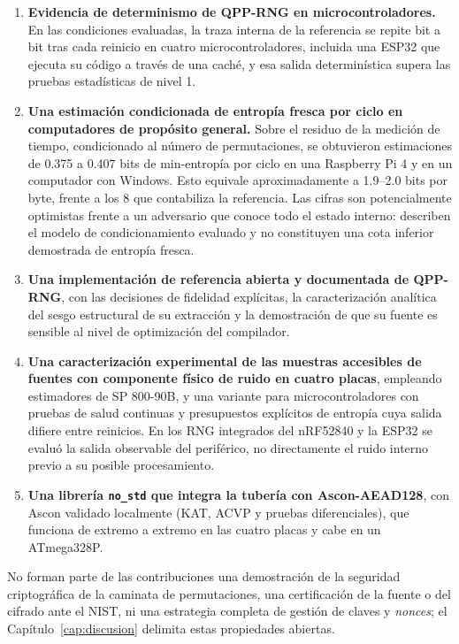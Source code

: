 \begin{enumerate}
    \item \textbf{Evidencia de determinismo de QPP-RNG en microcontroladores.} En las condiciones evaluadas, la traza interna de la referencia se repite bit a bit tras cada reinicio en cuatro microcontroladores, incluida una ESP32 que ejecuta su código a través de una caché, y esa salida determinística supera las pruebas estadísticas de nivel 1.
    \item \textbf{Una estimación condicionada de entropía fresca por ciclo en computadores de propósito general.} Sobre el residuo de la medición de tiempo, condicionado al número de permutaciones, se obtuvieron estimaciones de 0.375 a 0.407 bits de min-entropía por ciclo en una Raspberry Pi 4 y en un computador con Windows. Esto equivale aproximadamente a 1.9--2.0 bits por byte, frente a los 8 que contabiliza la referencia. Las cifras son potencialmente optimistas frente a un adversario que conoce todo el estado interno: describen el modelo de condicionamiento evaluado y no constituyen una cota inferior demostrada de entropía fresca.
    \item \textbf{Una implementación de referencia abierta y documentada de QPP-RNG}, con las decisiones de fidelidad explícitas, la caracterización analítica del sesgo estructural de su extracción y la demostración de que su fuente es sensible al nivel de optimización del compilador.
    \item \textbf{Una caracterización experimental de las muestras accesibles de fuentes con componente físico de ruido en cuatro placas}, empleando estimadores de SP 800-90B, y una variante para microcontroladores con pruebas de salud continuas y presupuestos explícitos de entropía cuya salida difiere entre reinicios. En los RNG integrados del nRF52840 y la ESP32 se evaluó la salida observable del periférico, no directamente el ruido interno previo a su posible procesamiento.
    \item \textbf{Una librería \texttt{no\_std} que integra la tubería con Ascon-AEAD128}, con Ascon validado localmente (KAT, ACVP y pruebas diferenciales), que funciona de extremo a extremo en las cuatro placas y cabe en un ATmega328P.
\end{enumerate}

No forman parte de las contribuciones una demostración de la seguridad criptográfica de la caminata de permutaciones, una certificación de la fuente o del cifrado ante el NIST, ni una estrategia completa de gestión de claves y \textit{nonces}; el Capítulo~\ref{cap:discusion} delimita estas propiedades abiertas.

